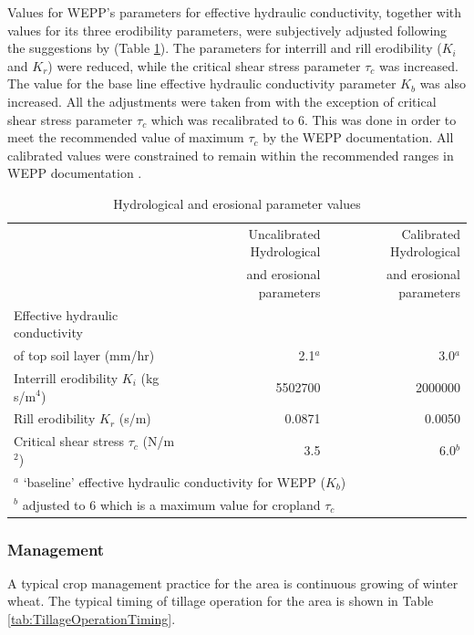 Values for WEPP's parameters for effective hydraulic conductivity, together with
values for its three erodibility parameters, were subjectively adjusted
following the suggestions by \citet{favis-mortlock1998-141} (Table
\ref{tab:HydrologicalAndErosionalParameters}). The parameters for interrill and
rill erodibility ($K_i$ and $K_r$) were reduced, while the critical shear stress
parameter $\tau_c$ was increased. The value for the base line effective
hydraulic conductivity parameter $K_b$ was also increased. All the adjustments
were taken from \citet{favis-mortlock1998-141} with the exception of critical
shear stress parameter $\tau_c$ which was recalibrated to 6. This was done in
order to meet the recommended value of maximum  $\tau_c$ by the WEPP
documentation. All calibrated values were constrained to remain within the
recommended ranges in WEPP documentation \citep{flanagan1995-usda}.

\begin{table}[htbp]
  \centering
  \caption[Hydrological and erosional parameter values]{Hydrological and
erosional parameter values \citep[After][]{favis-mortlock1998-141}}
  \label{tab:HydrologicalAndErosionalParameters}
    \small
    \begin{tabular}{lrr}
    \toprule
    & Uncalibrated Hydrological & Calibrated Hydrological\\
    & and erosional parameters & and erosional parameters\\
    \midrule
    Effective hydraulic conductivity & &\\
    of top soil layer (mm/hr) & 2.1$^a$ & 3.0$^a$\\
    Interrill erodibility $K_i$ (kg s/m$^4$) & 5502700 & 2000000\\
    Rill erodibility $K_r$ (s/m) & 0.0871 & 0.0050\\
    Critical shear stress $\tau_c$ (N/m$^2$) & 3.5 & 6.0$^b$\\
    \bottomrule
    \multicolumn{3}{l}{\footnotesize $^a$ `baseline' effective
hydraulic conductivity for WEPP ($K_b$)}\\
    \multicolumn{3}{l}{\footnotesize $^b$ adjusted to 6 which is a
maximum value for cropland $\tau_c$}
    \end{tabular}
\end{table}

\subsubsection{Management}
\label{sec:Management}
A typical crop management practice for the area is continuous growing of winter
wheat. The typical timing of tillage operation for the area is shown in Table
\ref{tab:TillageOperationTiming}.

